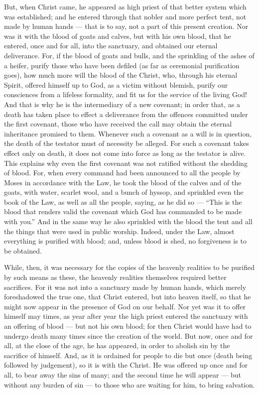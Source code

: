  But, when Christ came, he appeared as high priest of that
better system which was established; and he entered through that nobler
and more perfect tent, not made by human hands --- that is to say, not a
part of this present creation.  Nor was it with the blood
of goats and calves, but with his own blood, that he entered, once and
for all, into the sanctuary, and obtained our eternal deliverance.
 For, if the blood of goats and bulls, and the sprinkling
of the ashes of a heifer, purify those who have been defiled (as far as
ceremonial purification goes),  how much more will the
blood of the Christ, who, through his eternal Spirit, offered himself up
to God, as a victim without blemish, purify our consciences from a
lifeless formality, and fit us for the service of the living God!
 And that is why he is the intermediary of a new covenant;
in order that, as a death has taken place to effect a deliverance from
the offences committed under the first covenant, those who have received
the call may obtain the eternal inheritance promised to them.
 Whenever such a covenant as a will is in question, the
death of the testator must of necessity be alleged.  For
such a covenant takes effect only on death, it does not come into force
as long as the testator is alive.  This explains why even
the first covenant was not ratified without the shedding of blood.
 For, when every command had been announced to all the
people by Moses in accordance with the Law, he took the blood of the
calves and of the goats, with water, scarlet wool, and a bunch of
hyssop, and sprinkled even the book of the Law, as well as all the
people,  saying, as he did so --- ``This is the blood that
renders valid the covenant which God has commanded to be made with
you.''  And in the same way he also sprinkled with the
blood the tent and all the things that were used in public worship.
 Indeed, under the Law, almost everything is purified with
blood; and, unless blood is shed, no forgiveness is to be obtained.

 While, then, it was necessary for the copies of the
heavenly realities to be purified by such means as these, the heavenly
realities themselves required better sacrifices.  For it
was not into a sanctuary made by human hands, which merely foreshadowed
the true one, that Christ entered, but into heaven itself, so that he
might now appear in the presence of God on our behalf.  Nor
yet was it to offer himself may times, as year after year the high
priest entered the sanctuary with an offering of blood --- but not his
own blood;  for then Christ would have had to undergo death
many times since the creation of the world. But now, once and for all,
at the close of the age, he has appeared, in order to abolish sin by the
sacrifice of himself.  And, as it is ordained for people to
die but once (death being followed by judgement),  so it is
with the Christ. He was offered up once and for all, to bear away the
sins of many; and the second time he will appear --- but without any
burden of sin --- to those who are waiting for him, to bring salvation.

